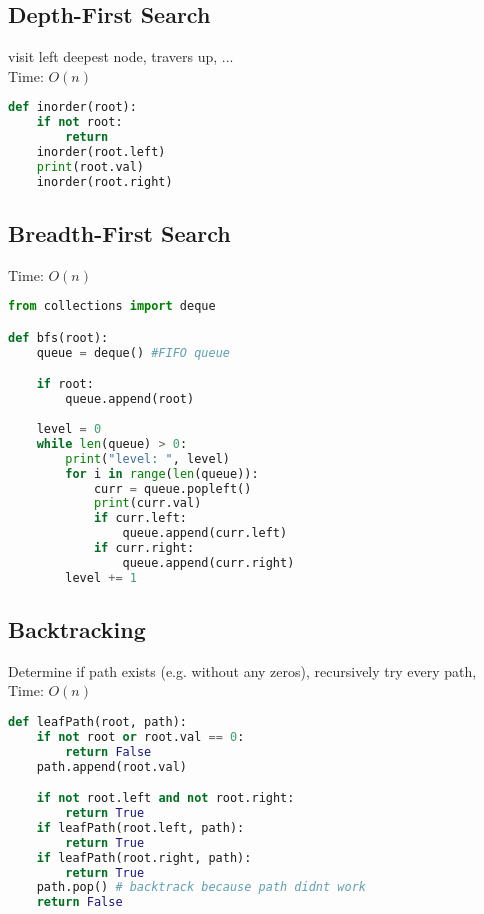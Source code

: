 \documentclass[english, threecolumn]{latex4ei/latex4ei_sheet}
\begin{document}
\begin{sectionbox}
\subsection{Depth-First Search}
visit left deepest node, travers up, ...\\
Time: $O(n)$
\begin{lstlisting}[language=python, gobble=0]
def inorder(root):
    if not root:
        return    
    inorder(root.left)
    print(root.val)
    inorder(root.right)
\end{lstlisting}
\end{sectionbox}

\begin{sectionbox}
\subsection{Breadth-First Search}
Time: $O(n)$
\begin{lstlisting}[language=python, gobble=0]
from collections import deque

def bfs(root):
    queue = deque() #FIFO queue

    if root:
        queue.append(root)
    
    level = 0
    while len(queue) > 0:
        print("level: ", level)
        for i in range(len(queue)):
            curr = queue.popleft()
            print(curr.val)
            if curr.left:
                queue.append(curr.left)
            if curr.right:
                queue.append(curr.right)
        level += 1
\end{lstlisting}
\end{sectionbox}

\begin{sectionbox}
\subsection{Backtracking}
Determine if path exists (e.g. without any zeros), recursively try every path, Time: $O(n)$
\begin{lstlisting}[language=python, gobble=0]
def leafPath(root, path):
    if not root or root.val == 0:
        return False
    path.append(root.val)

    if not root.left and not root.right:
        return True
    if leafPath(root.left, path):
        return True
    if leafPath(root.right, path):
        return True
    path.pop() # backtrack because path didnt work
    return False
\end{lstlisting}
\end{sectionbox}
\end{document}
